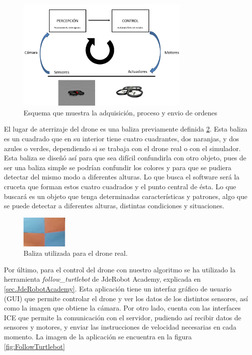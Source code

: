 \begin{figure}[H]
	\centering
		\includegraphics[width=0.75\textwidth]{imgs/esquema2.png}
         \caption{Esquema que muestra la adquisici\'on, proceso y envio de ordenes}
	\label{fig:esquema_d1}
\end{figure}

\hspace{1 cm} El lugar de aterrizaje del drone es una baliza previamente definida \ref{fig:esquema_d}. Esta baliza es un cuadrado que en su interior tiene cuatro cuadrantes, dos naranjas, y dos azules o verdes, dependiendo si se trabaja con el drone real o con el simulador. Esta baliza se diseñ\'o as\'i para que sea dif\'icil confundirla con otro objeto, pues de ser una baliza simple se podr\'ian confundir los colores y para que se pudiera detectar del mismo modo a diferentes alturas. Lo que busca el software ser\'a la cruceta que forman estos cuatro cuadrados y el punto central de \'esta. Lo que buscar\'a es un objeto que tenga determinadas caracter\'isticas y patrones, algo que se puede detectar a diferentes alturas, distintas condiciones y situaciones.

\begin{figure}[H]
	\centering
		\includegraphics[width=0.2\textwidth]{imgs/baliza.jpg}
         \caption{Baliza utilizada para el drone real.}
	\label{fig:esquema_d}
\end{figure}


\hspace{1 cm} Por \'ultimo, para el control del drone con nuestro algoritmo se ha utilizado la herramienta \textit{follow\_turtlebot} de JdeRobot Academy, explicada en \ref{sec.JdeRobotAcademy}. Esta aplicaci\'on tiene un interfaz gr\'afico de usuario (GUI) que permite controlar el drone y ver los datos de los distintos sensores, as\'i como la imagen que obtiene la c\'amara. Por otro lado, cuenta con las interfaces ICE que permite la comunicaci\'on con el servidor, pudiendo as\'i recibir datos de sensores y motores, y enviar las instrucciones de velocidad necesarias en cada momento. La imagen de la aplicaci\'on se encuentra en la figura \ref{fig:FollowTurtlebot}


